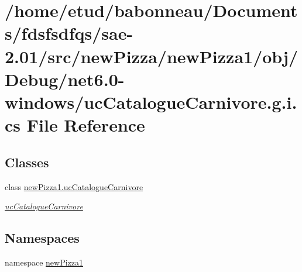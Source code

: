 \hypertarget{net6_80-windows_2ucCatalogueCarnivore_8g_8i_8cs}{}\section{/home/etud/babonneau/\+Documents/fdsfsdfqs/sae-\/2.01/src/new\+Pizza/new\+Pizza1/obj/\+Debug/net6.0-\/windows/uc\+Catalogue\+Carnivore.g.\+i.\+cs File Reference}
\label{net6_80-windows_2ucCatalogueCarnivore_8g_8i_8cs}
\subsection*{Classes}
\begin{DoxyCompactItemize}
\item 
class \hyperlink{classnewPizza1_1_1ucCatalogueCarnivore}{new\+Pizza1.\+uc\+Catalogue\+Carnivore}
\begin{DoxyCompactList}\small\item\em \hyperlink{classnewPizza1_1_1ucCatalogueCarnivore}{uc\+Catalogue\+Carnivore} \end{DoxyCompactList}\end{DoxyCompactItemize}
\subsection*{Namespaces}
\begin{DoxyCompactItemize}
\item 
namespace \hyperlink{namespacenewPizza1}{new\+Pizza1}
\end{DoxyCompactItemize}
